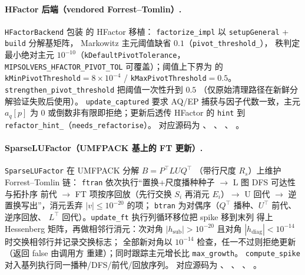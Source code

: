 \paragraph{HFactor 后端（vendored Forrest--Tomlin）.}
\texttt{HFactorBackend} 包装
 的 HFactor 移植：
\texttt{factorize\_impl} 以 \texttt{setupGeneral} + \texttt{build} 分解基矩阵，
Markowitz 主元阈值缺省 $0.1$（\texttt{pivot\_threshold\_}），
秩判定最小绝对主元 $10^{-10}$（\texttt{kDefaultPivotTolerance}，
\texttt{MIPSOLVERS\_HFACTOR\_PIVOT\_TOL} 可覆盖）；阈值上下界为
的 \texttt{kMinPivotThreshold}${}=8\times10^{-4}$ /
\texttt{kMaxPivotThreshold}${}=0.5$。
\texttt{strengthen\_pivot\_threshold} 把阈值一次性升到 $0.5$
（仅原始清理路径在新鲜分解验证失败后使用）。
\texttt{update\_captured} 要求 AQ/EP 捕获与因子代数一致，主元
$a_q[p]$ 为 $0$ 或倒数非有限即拒绝；更新后透传 HFactor 的
\texttt{hint} 到 \texttt{refactor\_hint\_}（\texttt{needs\_refactorise}）。
对应源码为 、
、
、
。

\paragraph{SparseLUFactor（UMFPACK 基上的 FT 更新）.}
\texttt{SparseLUFactor} 在 UMFPACK 分解 $B = P^{\top} L U Q^{\top}$
（带行尺度 $R_s$）上维护 Forrest--Tomlin 链：
\texttt{ftran} 依次执行``置换+尺度播种种子 $\to$ L 图 DFS 可达性与拓扑序
前代 $\to$ FT 项按序回放（先行交换 $S_i$ 再消元 $E_i$）$\to$ U 回代
$\to$ 逆置换写出''，消元丢弃 $|v| \le 10^{-20}$ 的项；
\texttt{btran} 为对偶序（$Q^{\top}$ 播种、$U^{\top}$ 前代、逆序回放、
$L^{\top}$ 回代）。\texttt{update\_ft} 执行列循环移位把 spike 移到末列
得上 Hessenberg 矩阵，再做相邻行消元：次对角 $|h_{\text{sub}}| > 10^{-20}$
且对角 $|h_{\text{diag}}| < 10^{-14}$ 时交换相邻行并记录交换标志；
全部新对角以 $10^{-14}$ 检查，任一不过则拒绝更新（返回 false 由调用方
重建）；同时跟踪主元增长比 \texttt{max\_growth}。
\texttt{compute\_spike} 对入基列执行同一播种/DFS/前代/回放序列。
对应源码为 、
、
、
。

